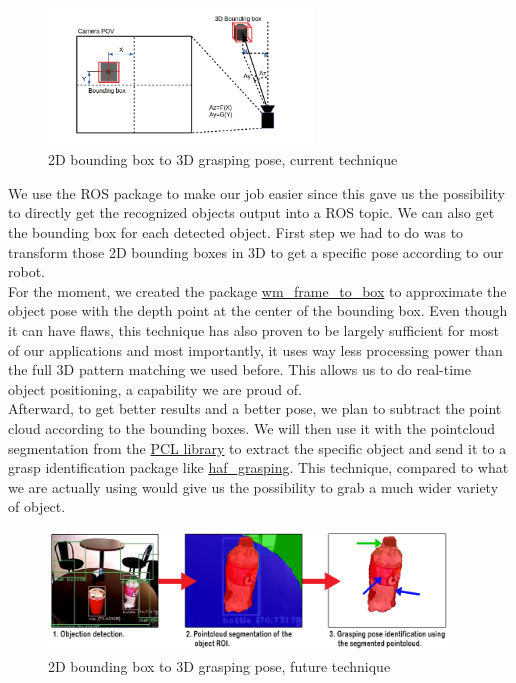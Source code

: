 \documentclass[runningheads,a4paper]{llncs}
\begin{document}
\begin{figure}
  \centering
  \includegraphics[width=200pt]{images/frame_to_box.png}
  \caption{2D bounding box to 3D grasping pose, current technique}
\end{figure} 
 
We use the ROS package to make our job easier since this gave us the possibility to directly get the recognized objects output into a ROS topic. We can also get the bounding box for each detected object. First step we had to do was to transform those 2D bounding boxes in 3D to get a specific pose according to our robot. \\

For the moment, we created the package \href{https://github.com/WalkingMachine/wm_frame_to_box}{wm\_frame\_to\_box} to approximate the object pose with the depth point at the center of the bounding box. Even though it can have flaws, this technique has also proven to be largely sufficient for most of our applications and most importantly, it uses way less processing power than the full 3D pattern matching we used before. This allows us to do real-time object positioning, a capability we are proud of.\\

Afterward, to get better results and a better pose, we plan to subtract the point cloud according to the bounding boxes. We will then use it with the pointcloud segmentation from the \href{http://pointclouds.org}{PCL library} to extract the specific object and send it to a grasp identification package like \href{http://http://wiki.ros.org/haf_grasping}{haf\_grasping}. This technique, compared to what we are actually using would give us the possibility to grab a much wider variety of object.\\

\begin{figure}
  \centering
  \includegraphics[width=300pt]{images/frame_to_box2.png}
  \caption{2D bounding box to 3D grasping pose, future technique}
\end{figure}
\end{document}
